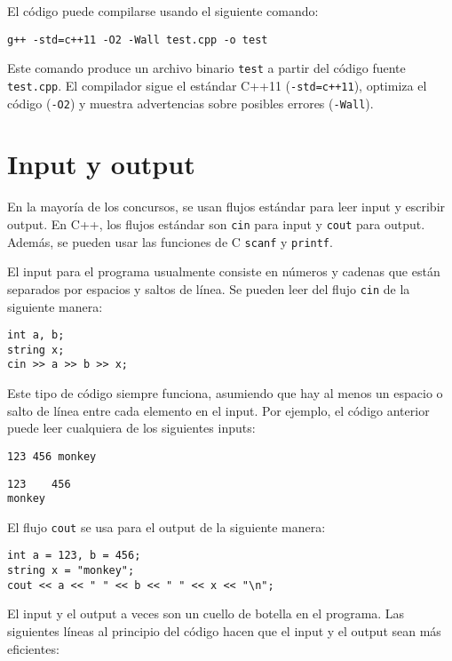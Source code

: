 El c\'odigo puede compilarse usando el siguiente comando:

\begin{lstlisting}
g++ -std=c++11 -O2 -Wall test.cpp -o test
\end{lstlisting}

Este comando produce un archivo binario \texttt{test}
a partir del c\'odigo fuente \texttt{test.cpp}.
El compilador sigue el est\'andar C++11
(\texttt{-std=c++11}),
optimiza el c\'odigo (\texttt{-O2})
y muestra advertencias sobre posibles errores (\texttt{-Wall}).

\section{Input y output}


En la mayor\'ia de los concursos, se usan flujos est\'andar para
leer input y escribir output.
En C++, los flujos est\'andar son
\texttt{cin} para input y \texttt{cout} para output.
Adem\'as, se pueden usar las funciones de C
\texttt{scanf} y \texttt{printf}.

El input para el programa usualmente consiste en
n\'umeros y cadenas que est\'an separados por
espacios y saltos de l\'inea.
Se pueden leer del flujo \texttt{cin}
de la siguiente manera:

\begin{lstlisting}
int a, b;
string x;
cin >> a >> b >> x;
\end{lstlisting}

Este tipo de c\'odigo siempre funciona,
asumiendo que hay al menos un espacio
o salto de l\'inea entre cada elemento en el input.
Por ejemplo, el c\'odigo anterior puede leer
cualquiera de los siguientes inputs:
\begin{lstlisting}
123 456 monkey
\end{lstlisting}
\begin{lstlisting}
123    456
monkey
\end{lstlisting}
El flujo \texttt{cout} se usa para el output
de la siguiente manera:
\begin{lstlisting}
int a = 123, b = 456;
string x = "monkey";
cout << a << " " << b << " " << x << "\n";
\end{lstlisting}

El input y el output a veces son
un cuello de botella en el programa.
Las siguientes l\'ineas al principio del c\'odigo
hacen que el input y el output sean m\'as eficientes:

